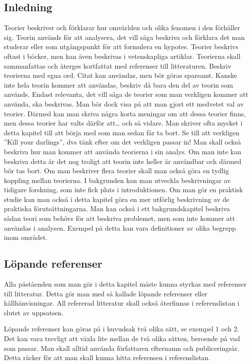 \documentclass[a4paper,12pt]{article} %
\begin{document}
\subsection{Inledning}
Teorier beskriver och förklarar hur omvärlden och olika fenomen i den förhåller sig. Teorin används för att analysera, det vill säga beskriva och förklara det man studerar eller som utgångspunkt för att formulera en hypotes. Teorier beskrivs oftast i böcker, men kan även beskrivas i vetenskapliga artiklar. 
	Teorierna skall sammanfattas och återges kortfattat med referenser till litteraturen. Beskriv teorierna med egna ord. Citat kan användas, men bör göras sparsamt. Kanske inte hela teorin kommer att användas, beskriv då bara den del av teorin som används. Endast relevanta, det vill säga de teorier som man verkligen kommer att använda, ska beskrivas. Man bör dock visa på att man gjort ett medvetet val av teorier. Därmed kan man skriva några korta meningar om att dessa teorier finns, men dessa teorier har valts därför att… och så vidare. Man skriver ofta mycket i detta kapitel till att börja med som man sedan får ta bort. Se till att verkligen ”Kill your darlings”, dvs tänk efter om det verkligen passar in! Man skall också beskriva hur man kommer att använda teorierna i sin analys. Om man inte kan beskriva detta är det nog troligt att teorin inte heller är användbar och därmed bör tas bort. Om man beskriver flera teorier skall man också göra en tydlig koppling mellan teorierna. 
	I bakgrunden kan man utveckla beskrivningar av tidigare forskning, som inte fick plats i introduktionen. Om man gör en praktisk studie kan man också i detta kapitel göra en mer utförlig beskrivning av de praktiska förutsättningarna. Man kan också i ett bakgrundskapitel beskriva sådan teori som behövs för att beskriva problemet, men som inte kommer att användas i analysen. Exempel på detta kan vara definitioner av olika begrepp inom området. 
			
\subsection{Löpande referenser}
Alla påståenden som man gör i detta kapitel måste kunna styrkas med referenser till litteratur. Detta gör man med så kallade löpande referenser eller källhänvisningar. All refererad litteratur skall också återfinnas i referenslistan i slutet av uppsatsen. 

Löpande referenser kan göras på i huvudsak två olika sätt, se exempel 1 och 2. Det kan vara trevligt att växla lite mellan de två olika sätten, beroende på vad som passar. Man skall alltid använda författaren efternamn och publiceringsår. Detta räcker för att man skall kunna hitta referensen i referenslistan.\\
\end{document}
